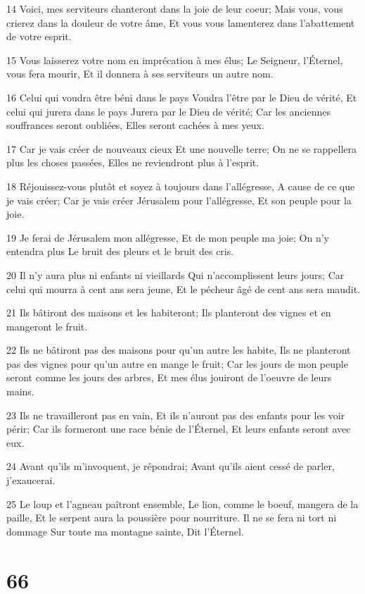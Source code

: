 \par 14 Voici, mes serviteurs chanteront dans la joie de leur coeur; Mais vous, vous crierez dans la douleur de votre âme, Et vous vous lamenterez dans l'abattement de votre esprit.
\par 15 Vous laisserez votre nom en imprécation à mes élus; Le Seigneur, l'Éternel, vous fera mourir, Et il donnera à ses serviteurs un autre nom.
\par 16 Celui qui voudra être béni dans le pays Voudra l'être par le Dieu de vérité, Et celui qui jurera dans le pays Jurera par le Dieu de vérité; Car les anciennes souffrances seront oubliées, Elles seront cachées à mes yeux.
\par 17 Car je vais créer de nouveaux cieux Et une nouvelle terre; On ne se rappellera plus les choses passées, Elles ne reviendront plus à l'esprit.
\par 18 Réjouissez-vous plutôt et soyez à toujours dans l'allégresse, A cause de ce que je vais créer; Car je vais créer Jérusalem pour l'allégresse, Et son peuple pour la joie.
\par 19 Je ferai de Jérusalem mon allégresse, Et de mon peuple ma joie; On n'y entendra plus Le bruit des pleurs et le bruit des cris.
\par 20 Il n'y aura plus ni enfants ni vieillards Qui n'accomplissent leurs jours; Car celui qui mourra à cent ans sera jeune, Et le pécheur âgé de cent ans sera maudit.
\par 21 Ils bâtiront des maisons et les habiteront; Ils planteront des vignes et en mangeront le fruit.
\par 22 Ils ne bâtiront pas des maisons pour qu'un autre les habite, Ils ne planteront pas des vignes pour qu'un autre en mange le fruit; Car les jours de mon peuple seront comme les jours des arbres, Et mes élus jouiront de l'oeuvre de leurs mains.
\par 23 Ils ne travailleront pas en vain, Et ils n'auront pas des enfants pour les voir périr; Car ils formeront une race bénie de l'Éternel, Et leurs enfants seront avec eux.
\par 24 Avant qu'ils m'invoquent, je répondrai; Avant qu'ils aient cessé de parler, j'exaucerai.
\par 25 Le loup et l'agneau paîtront ensemble, Le lion, comme le boeuf, mangera de la paille, Et le serpent aura la poussière pour nourriture. Il ne se fera ni tort ni dommage Sur toute ma montagne sainte, Dit l'Éternel.

\chapter{66}

